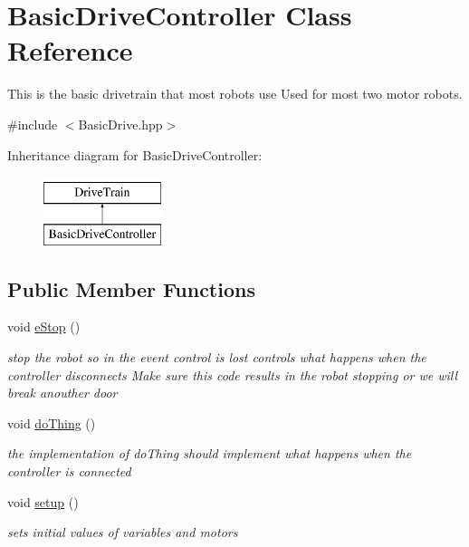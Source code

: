 \hypertarget{class_basic_drive_controller}{}\section{Basic\+Drive\+Controller Class Reference}
\label{class_basic_drive_controller}


This is the basic drivetrain that most robots use Used for most two motor robots.  




{\ttfamily \#include $<$Basic\+Drive.\+hpp$>$}

Inheritance diagram for Basic\+Drive\+Controller\+:\begin{figure}[H]
\begin{center}
\leavevmode
\includegraphics[height=2.000000cm]{class_basic_drive_controller}
\end{center}
\end{figure}
\subsection*{Public Member Functions}
\begin{DoxyCompactItemize}
\item 
\mbox{\label{class_basic_drive_controller_a460f99786b7e701d72a91466f5cc8041}} 
void \mbox{\hyperlink{class_basic_drive_controller_a460f99786b7e701d72a91466f5cc8041}{e\+Stop}} ()
\begin{DoxyCompactList}\small\item\em stop the robot so in the event control is lost controls what happens when the controller disconnects Make sure this code results in the robot stopping or we will break anouther door \end{DoxyCompactList}\item 
\mbox{\label{class_basic_drive_controller_a11b639d12205bb597f07206df6721950}} 
void \mbox{\hyperlink{class_basic_drive_controller_a11b639d12205bb597f07206df6721950}{do\+Thing}} ()
\begin{DoxyCompactList}\small\item\em the implementation of do\+Thing should implement what happens when the controller is connected \end{DoxyCompactList}\item 
\mbox{\label{class_basic_drive_controller_a511911167940331dcf369aaf925e9fde}} 
void \mbox{\hyperlink{class_basic_drive_controller_a511911167940331dcf369aaf925e9fde}{setup}} ()
\begin{DoxyCompactList}\small\item\em sets initial values of variables and motors \end{DoxyCompactList}\end{DoxyCompactItemize}
